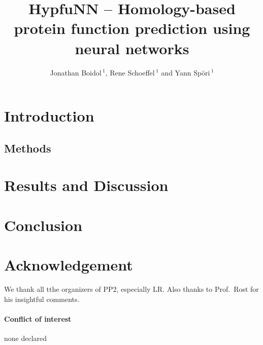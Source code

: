 \documentclass{bioinfo}
\begin{document}

\title[Homology-based function prediction]{HypfuNN -- Homology-based protein function prediction using neural networks}
\author[]{Jonathan Boidol\,$^{1}$, Rene Schoeffel\,$^{1}$ and Yann Sp\"ori\,$^{1}$}
\address{$^{1}$TUM (Technische Universit\"at M\"unchen) Department of Informatics, Bioinformatics \& Computational Biology - i12, Boltzmannstr.~3, 85748 Garching/Munich, Germany}
\history{}

\editor{}

\maketitle



\section{Introduction}



\begin{methods}
\section{Methods}



\end{methods}
\section{Results and Discussion}



\section{Conclusion}




\section*{Acknowledgement}
We thank all tthe organizers of PP2, especially LR. Also thanks to Prof.~Rost for his insightful comments.
\paragraph{Conflict of interest\textcolon} none declared



\end{document}
